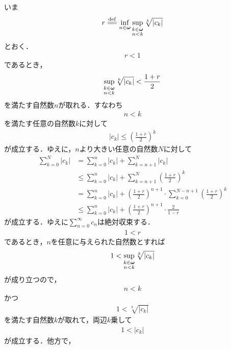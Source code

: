 	\begin{sketch}
		いま
		\begin{align}
			r \defeq \inf{n \in \Natural}{\sup{\substack{k \in \Natural \\ n < k}}{\sqrt[k]{|c_{k}|}}}
		\end{align}
		とおく．
		\begin{align}
			r < 1
		\end{align}
		であるとき，
		\begin{align}
			\operatorname*{sup}_{\substack{k \in {\boldsymbol \omega} \\ n < k}} \sqrt[k]{|c_{k}|} < \frac{1+r}{2}
		\end{align}
		を満たす自然数$n$が取れる．すなわち
		\begin{align}
			n < k
		\end{align}
		を満たす任意の自然数$k$に対して
		\begin{align}
			|c_{k}| \leq \left(\frac{1+r}{2}\right)^{k}
		\end{align}
		が成立する．ゆえに，$n$より大きい任意の自然数$N$に対して
		\begin{align}
			\sum_{k=0}^{N} |c_k|
			&= \sum_{k=0}^{n} |c_k| + \sum_{k=n+1}^{N} |c_k| \\
			&\leq \sum_{k=0}^{n} |c_k| + \sum_{k=n+1}^{N} \left(\frac{1+r}{2}\right)^{k} \\
			&= \sum_{k=0}^{n} |c_k| + \left(\frac{1+r}{2}\right)^{n+1} \cdot \sum_{k=0}^{N-n+1} \left(\frac{1+r}{2}\right)^{k} \\
			&\leq \sum_{k=0}^{n} |c_k| + \left(\frac{1+r}{2}\right)^{n+1} \cdot \frac{2}{1-r}
		\end{align}
		が成立する．ゆえに$\sum_{n=0}^{\infty} c_{n}$は絶対収束する．
		\begin{align}
			1 < r
		\end{align}
		であるとき，$n$を任意に与えられた自然数とすれば
		\begin{align}
			1 < \operatorname*{sup}_{\substack{k \in {\boldsymbol \omega} \\ n < k}} \sqrt[k]{|c_{k}|}
		\end{align}
		が成り立つので，
		\begin{align}
			n < k
		\end{align}
		かつ
		\begin{align}
			1 < \sqrt[k]{|c_{k}|}
		\end{align}
		を満たす自然数$k$が取れて，両辺$k$乗して
		\begin{align}
			1 < |c_{k}|
		\end{align}
		が成立する．他方で，

\end{sketch}
